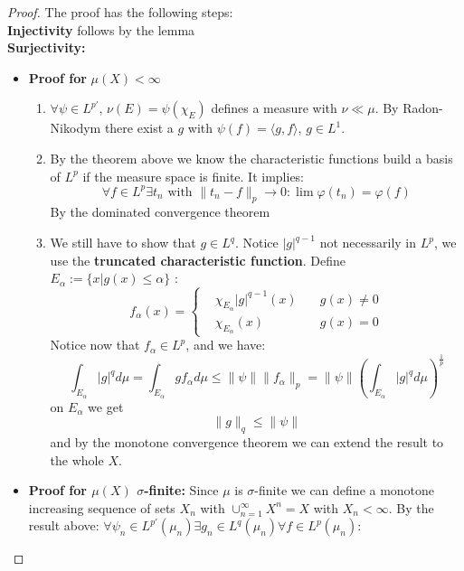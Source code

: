 \begin{proof}
	The proof has the following steps:\\ 
	\textbf{Injectivity} follows by the lemma\\
	\textbf{Surjectivity:}
	\begin{itemize}
		\item \textbf{Proof for} $\mu(X) < \infty$
			\begin{enumerate}
				\item $\forall \psi \in L^{p'}$, $\nu(E) = \psi(\chi_E)$ defines a measure with $\nu \ll \mu$. By Radon-Nikodym there exist a $g$ with $\psi(f) = \langle g, f\rangle$, $g \in L^1$. 
				\item By the theorem above we know the characteristic functions build a basis of $L^p$ if the measure space is finite. It implies:
					\begin{equation*}
						\forall f \in L^p \exists t_n \text{ with } \|t_n - f\|_p \rightarrow 0 : \lim \varphi(t_n) = \varphi(f)
					\end{equation*}
					By the dominated convergence theorem
				\item We still have to show that $g \in L^q$. Notice $|g|^{q - 1}$ not necessarily in $L^p$, we use the \textbf{truncated characteristic function}. Define $E_\alpha := \{x|g(x) \leq \alpha \}$  :
				\begin{equation*}
					f_\alpha(x) = 
					\left\{\begin{aligned}
						&\chi_{E_\alpha} |g|^{q - 1}(x) \quad &g(x) \neq 0 \\
						&\chi_{E_\alpha} (x) \quad &g(x) = 0
					\end{aligned}\right.
				\end{equation*}
				Notice now that $f_\alpha \in L^p$, and we have:
				\begin{equation*}
					\int_{E_\alpha} |g|^q d\mu= \int_{E_\alpha}g f_\alpha d\mu 
					\leq \|\psi\|\|f_\alpha\|_p = \|\psi\|(\int_{E_\alpha}|g|^q d\mu)^{\frac{1}{p}}
				\end{equation*}
				on $E_\alpha$ we get
				\begin{equation*}
					\|g\|_q \leq \|\psi\|
				\end{equation*}
				and by the monotone convergence theorem we can extend the result to the whole $X$.
			\end{enumerate}
		\item \textbf{Proof for $\mu(X)$ $\sigma$-finite:}
			Since $\mu$ is $\sigma$-finite we can define a monotone increasing sequence of sets $X_n$ with $\cup_{n = 1}^\infty X^n = X$ with $X_n < \infty$. By the result above: $\forall \psi_n \in L^{p'}(\mu_n) \exists g_n \in L^q(\mu_n) \forall f \in L^p(\mu_n)$:

\end{itemize}
\end{proof}
